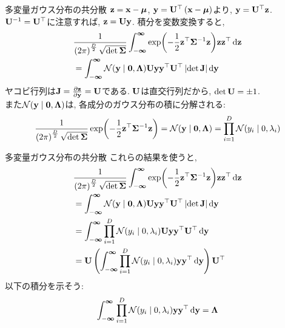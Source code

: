 \documentclass[dvipdfmx,notheorems,t]{beamer}
\begin{document}
\begin{frame}{多変量ガウス分布の共分散}
$\vb{z} = \vb{x} - \vb*{\mu}$, $\vb{y} = \vb{U}^\top \left( \vb{x} - \vb*{\mu} \right)$より,
$\vb{y} = \vb{U}^\top \vb{z}$. \\
$\vb{U}^{-1} = \vb{U}^\top$に注意すれば, $\vb{z} = \vb{U} \vb{y}$.
積分を変数変換すると,
\begin{align*}
  & \frac{1}{\left( 2\pi \right)^\frac{D}{2} \sqrt{\det \vb{\Sigma}}}
  \int_{-\boldsymbol{\infty}}^{\boldsymbol{\infty}}
    \exp(-\frac{1}{2} \vb{z}^\top \vb{\Sigma}^{-1} \vb{z}) \vb{z} \vb{z}^\top \dd{\vb{z}} \\
  &= \int_{-\boldsymbol{\infty}}^{\boldsymbol{\infty}}
    \mathcal{N}(\vb{y} \mid \vb{0}, \vb{\Lambda})
    \vb{U} \vb{y} \vb{y}^\top \vb{U}^\top \left| \det \vb{J} \right| \dd{\vb{y}}
\end{align*}
ヤコビ行列は$\vb{J} = \pdv{\vb{z}}{\vb{y}} = \vb{U}$である.
$\vb{U}$は直交行列だから, $\det \vb{U} = \pm 1$. \\
また$\mathcal{N}(\vb{y} \mid \vb{0}, \vb{\Lambda})$は, 各成分のガウス分布の積に分解される:
\begin{align*}
  \frac{1}{\left( 2\pi \right)^\frac{D}{2} \sqrt{\det \vb{\Sigma}}}
    \exp(-\frac{1}{2} \vb{z}^\top \vb{\Sigma}^{-1} \vb{z})
  = \mathcal{N}(\vb{y} \mid \vb{0}, \vb{\Lambda})
  = \prod_{i = 1}^D \mathcal{N}(y_i \mid 0, \lambda_i)
\end{align*}
\end{frame}

\begin{frame}{多変量ガウス分布の共分散}
これらの結果を使うと,
{\small \begin{align*}
  & \frac{1}{\left( 2\pi \right)^\frac{D}{2} \sqrt{\det \vb{\Sigma}}}
  \int_{-\boldsymbol{\infty}}^{\boldsymbol{\infty}}
    \exp(-\frac{1}{2} \vb{z}^\top \vb{\Sigma}^{-1} \vb{z}) \vb{z} \vb{z}^\top \dd{\vb{z}} \\
  &= \int_{-\boldsymbol{\infty}}^{\boldsymbol{\infty}}
    \mathcal{N}(\vb{y} \mid \vb{0}, \vb{\Lambda})
    \vb{U} \vb{y} \vb{y}^\top \vb{U}^\top \left| \det \vb{J} \right| \dd{\vb{y}} \\
  &= \int_{-\boldsymbol{\infty}}^{\boldsymbol{\infty}}
    \prod_{i = 1}^D \mathcal{N}(y_i \mid 0, \lambda_i)
    \vb{U} \vb{y} \vb{y}^\top \vb{U}^\top \dd{\vb{y}} \\
  &= \vb{U} \left( \int_{-\boldsymbol{\infty}}^{\boldsymbol{\infty}}
    \prod_{i = 1}^D \mathcal{N}(y_i \mid 0, \lambda_i)
    \vb{y} \vb{y}^\top \dd{\vb{y}} \right) \vb{U}^\top
\end{align*}}
以下の積分を示そう:
\begin{align*}
  \int_{-\boldsymbol{\infty}}^{\boldsymbol{\infty}}
    \prod_{i = 1}^D \mathcal{N}(y_i \mid 0, \lambda_i)
    \vb{y} \vb{y}^\top \dd{\vb{y}} = \vb{\Lambda}
\end{align*}
\end{frame}
\end{document}
